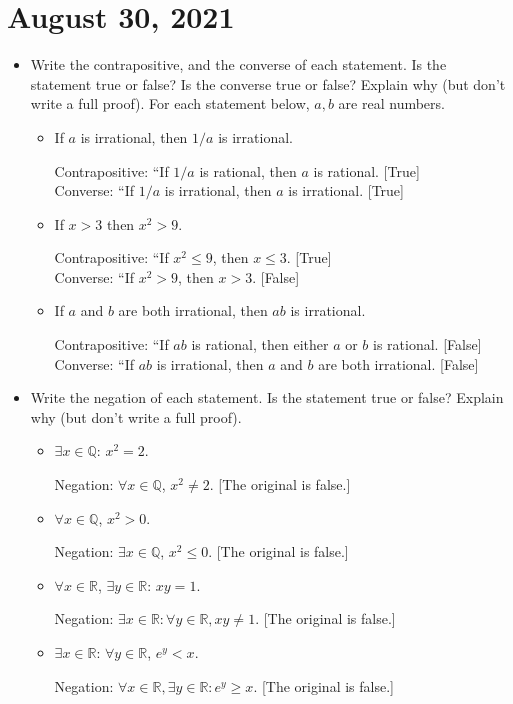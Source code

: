 \documentclass[12pt]{amsart}
\newcommand{\Q}{\mathbb{Q}}
\newcommand{\R}{{\mathbb{R}}}
\numberwithin{equation}{section}
\theoremstyle{plain} %
\newcommand{\Aug}[1]{\section{August #1, 2021}}
\theoremstyle{definition}
\theoremstyle{remark}
\begin{document}
\Aug{30}

	
	\begin{itemize}
		\item Write the contrapositive, and the converse of each statement. Is the statement true or false? Is the converse true or false? Explain why (but don't write a full proof). For each statement below, $a,b$ are real numbers.
		\begin{itemize}
			\item If $a$ is irrational, then $1/a$ is irrational.
			\begin{framed}
			Contrapositive: ``If $1/a$ is rational, then $a$ is rational. [True]\\
			Converse: ``If $1/a$ is irrational, then $a$ is irrational. [True]\end{framed}

			\item If $x>3$ then $x^2>9$.\begin{framed}
			Contrapositive: ``If $x^2 \leq 9$, then  $x\leq 3$. [True]\\
			Converse: ``If $x^2 > 9$, then $x> 3$. [False]\end{framed}
						\item If $a$ and $b$ are both irrational, then $ab$ is irrational.\begin{framed}
			Contrapositive: ``If $ab$ is rational, then either $a$ or $b$ is rational. [False]\\
			Converse: ``If $ab$ is irrational, then $a$ and $b$ are both irrational. [False]\end{framed}
		\end{itemize}
	\item Write the negation of each statement. Is the statement true or false? Explain why (but don't write a full proof).
	\begin{itemize}
		\item $\exists x\in \Q$: $x^2=2$.\begin{framed}
		Negation: $\forall x\in \Q$, $x^2 \neq 2$. [The original is false.]
		\end{framed}
		\item $\forall x\in \Q$, $x^2>0$.
		\begin{framed}
		Negation: $\exists x\in \Q$, $x^2 \leq 0$. [The original is false.]\end{framed}
		\item $\forall x\in \R$, $\exists y\in \R$: $xy=1$.
		\begin{framed}
		Negation: $\exists x\in \R: \forall y\in \R, xy\neq 1$.
		[The original is false.]\end{framed}
			\item $\exists x\in \R$: $\forall y\in \R$, $e^y<x$.\begin{framed}
			Negation: $\forall x\in \R,\exists y\in \R: e^y\geq x$. [The original is false.]\end{framed}
			

\end{itemize}
\end{itemize}
\end{document}
